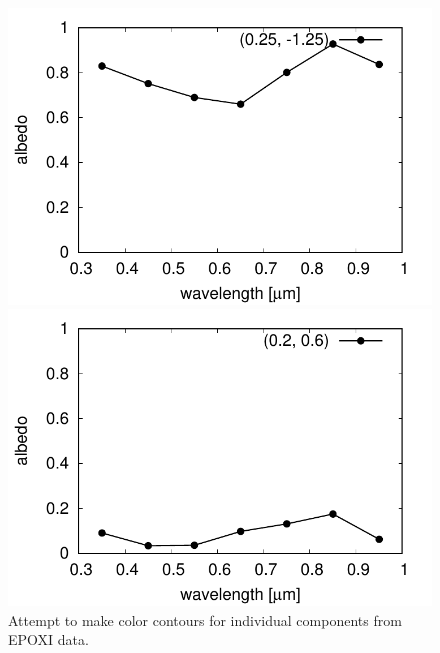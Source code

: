 \documentclass[iop,numberedappendix,apj]{emulateapj}
\begin{document}
\begin{figure}[tbh!]
   \begin{minipage}{0.33\hsize}
    \begin{center}
	\includegraphics[width=\hsize]{raddata_2_norm_noreg_1_sp.pdf}
    \end{center}	
   \end{minipage}
   \begin{minipage}{0.33\hsize}
    \begin{center}
	\includegraphics[width=\hsize]{raddata_2_norm_noreg_2_sp.pdf}
    \end{center}	
   \end{minipage}    \caption{Attempt to make color contours for individual components from EPOXI data. }
\label{fig:EPOXI_individual}
\end{figure}
\end{document}
